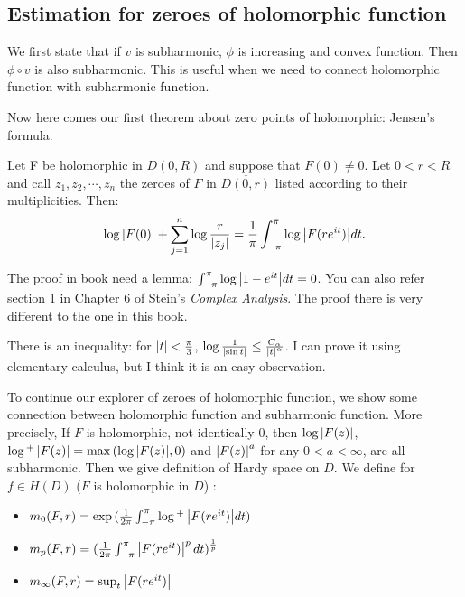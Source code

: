 \subsection{Estimation for zeroes of holomorphic function}
We first state that if $v$ is subharmonic, $\phi$ is increasing and convex function. Then $\phi\circ v$ is also subharmonic. This is useful when we need to connect holomorphic function with subharmonic function.\par

Now here comes our first theorem about zero points of holomorphic: Jensen's formula.
\begin{theorem}
    Let F be holomorphic in $D(0,R)$ and suppose that $F(0)\neq 0$. Let $0<r<R$ and call $z_1,z_2,\cdots,z_n$ the zeroes of $F$
    in $\overline{D(0,r)}$ listed according to their multiplicities. Then:
    \begin{equation}
        \log{\left\lvert F(0)\right\rvert}+\sum_{j=1}^{n}{\log{\frac{r}{\left\lvert z_j\right\rvert}}}=\frac{1}{\pi}\int_{-\pi}^{\pi}{\log{\left\lvert F(re^{it})\right\rvert}d t}.
    \end{equation}
\end{theorem}
The proof in book need a lemma: $\int_{-\pi}^{\pi}{\log{\left\lvert1-e^{it}\right\rvert}d t}=0$. You can also refer section 1 in Chapter 6 of Stein's \emph{Complex Analysis}. The proof there is very different to the one in this book.\par
\begin{remark}
    {\color{blue}There is an inequality: for $\left\lvert t\right\rvert<\frac{\pi}{3}$, $\log{\frac{1}{\left\lvert\sin{t}\right\rvert}}\leq \frac{C_\alpha}{\left\lvert t\right\rvert^\alpha}$. I can prove it
        using elementary calculus, but I think it is an easy observation.}
\end{remark}
To continue our explorer of zeroes of holomorphic function, we show some connection between holomorphic function and subharmonic
function. More precisely, If $F$ is holomorphic, not identically 0, then $\log{\left\lvert F(z)\right\rvert}$, $\log{^+\left\lvert F(z)\right\rvert}=\max{(\log{\left\lvert F(z)\right\rvert},0)}$
and $\left\lvert F(z)\right\rvert^a$ for any $0<a<\infty$, are all subharmonic. Then we give definition of Hardy space on $D$. We define for
$f\in H(D)$ ($F$ is holomorphic in $D$) :
\begin{itemize}
    \item $m_0(F,r)=\exp{(\frac{1}{2\pi}\int_{-\pi}^\pi{\log{^+\left\lvert F(re^{it})\right\rvert}d t})}$
    \item $m_p(F,r)=(\frac{1}{2\pi}\int_{-\pi}^\pi{\left\lvert F(re^{it})\right\rvert^p d t})^\frac{1}{p}$
    \item $m_\infty(F,r)=\sup_t{\left\lvert F(re^{it})\right\rvert}$
\end{itemize}

